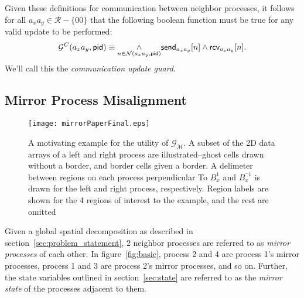 Given these definitions for communication between neighbor processes, it follows
for all $a_xa_y\in\mathcal{R} - \{00\}$ that the following boolean function
must be true for any valid update to be performed:
\begin{equation}
    \mathcal{G}^C(a_xa_y,\textup{\textsf{pid}}) \equiv \underset{n \in \mathcal{N}(a_xa_y,\textup{\textsf{pid}})}{\wedge}
    \textsf{send}_{a_xa_y}[n] \wedge \textsf{rcv}_{a_xa_y}[n].
    \label{eq:comm_guard}
\end{equation}
We'll call this the {\it communication update guard}.

\subsection{Mirror Process Misalignment}

\begin{figure}[h]
    \centering
    \texttt{[image: mirrorPaperFinal.eps]}
    \caption{A motivating example for the utility of $\mathcal{G_M}$.  A subset of the
    2D data arrays of a left and right process are illustrated--ghost cells drawn without a border, and
    border cells given a border.  A delimeter between regions on each process perpendicular To
     $B_x^{1}$ and $B_x^{^-1}$ is drawn for the left and right process, respectively.  Region labels
     are shown for the 4 regions of interest to the example, and the rest are omitted}
    \label{fig:mirror_motivation}
\end{figure}

Given a global spatial decomposition as described in section~\ref{sec:problem_statement},
2 neighbor processes are referred to as
{\it mirror processes} of each other.  In figure~\ref{fig:basic}, process 2 and 4 are process 1's mirror
processes, process 1 and 3 are process 2's mirror processes, and so on.  Further,
the state variables outlined in section~\ref{sec:state} are referred to as the
{\it mirror state} of the processes adjacent to them.

